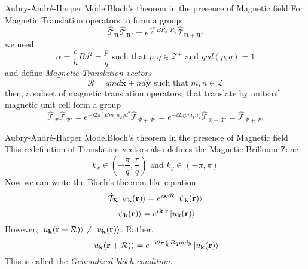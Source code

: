 \documentclass{beamer}
\begin{document}
\begin{frame}{Aubry-Andr\'{e}-Harper Model}{Bloch's theorem in the presence of Magnetic field}
 For Magnetic Translation operators to form a group
 \begin{equation*}
 \hat{\mathcal{T}}_{\mathbf{R}}\hat{\mathcal{T}}_{\mathbf{R}'} = e^{\frac{-ie}{\hbar}BR_{x}'R_{y}}\hat{\mathcal{T}}_{\mathbf{R} + \mathbf{R}'}
 \end{equation*}
 we need
 \begin{equation*}
 \alpha = \frac{e}{h}Bd^2 = \frac{p}{q} \text{ such that } p,q \in \mathcal{Z}^{+} \text{ and } gcd(p, q) = 1
\end{equation*} and define \emph{Magnetic Translation vectors}
\begin{equation*}
 \mathcal{R} = qmd \hat{\mathbf{x}} + nd \hat{\mathbf{y}} \text{ such that } m,n \in \mathcal{Z}
\end{equation*} then, a subset of magnetic translation operators, that translate by units of magnetic unit cell form a group
\begin{equation*}
 \hat{\mathcal{T}}_{\mathcal{R}}\hat{\mathcal{T}}_{\mathcal{R}'} = e^{-i2\pi\frac{e}{h}Bm_{1}n_{2}qd^2}\hat{\mathcal{T}}_{\mathcal{R} + \mathcal{R}'} = e^{-i2\pi p m_{1}n_{2}}\hat{\mathcal{T}}_{\mathcal{R} + \mathcal{R}'} = \hat{\mathcal{T}}_{\mathcal{R} + \mathcal{R}'}
\end{equation*}
\end{frame}

\begin{frame}{Aubry-Andr\'{e}-Harper Model}{Bloch's theorem in the presence of Magnetic field}\small
 This redefinition of Translation vectors also defines the \alert{Magnetic Brillouin Zone}
\begin{equation*}
 k_{x} \in \left(-\frac{\pi}{q},\frac{\pi}{q}\right) \text{ and } k_{y} \in (-\pi,\pi)
\end{equation*}
Now we can write the Bloch's theorem like equation
\begin{equation*}
 \hat{\mathcal{T}}_{\mathcal{R}}\ket{\psi_{\mathbf{k}}(\mathbf{r})} = e^{i\mathbf{k}\cdot\mathcal{R}}\ket{\psi_{\mathbf{k}}(\mathbf{r})}
\end{equation*}
\begin{equation*}
 \ket{\psi_{\mathbf{k}}(\mathbf{r})} = e^{i\mathbf{k}\cdot\mathbf{r}}\ket{u_{\mathbf{k}}(\mathbf{r})}
\end{equation*}
However, $\ket{u_{\mathbf{k}}(\mathbf{r}+\mathcal{R})} \neq \ket{u_{\mathbf{k}}(\mathbf{r})}$. Rather,
\begin{equation*}
 \ket{u_{\mathbf{k}}(\mathbf{r} + \mathcal{R})} = e^{-i2\pi\frac{e}{h}Bqmdy}\ket{u_{\mathbf{k}}(\mathbf{r})}
\end{equation*} This is called the \emph{Generalized bloch condition}. \normalsize
\end{frame}
\end{document}
